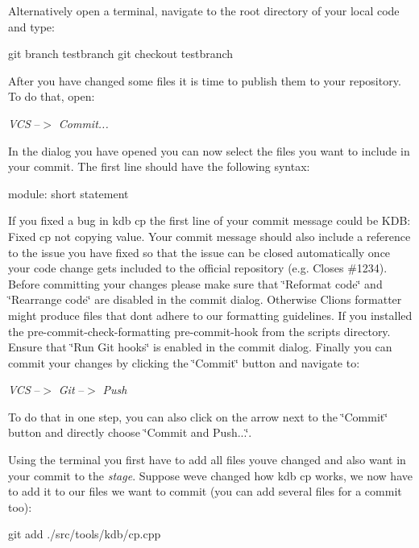 Alternatively open a terminal, navigate to the root directory of your local code and type\+:


\begin{DoxyCode}
git branch testbranch
git checkout testbranch
\end{DoxyCode}


After you have changed some files it is time to publish them to your repository. To do that, open\+:

{\itshape V\+CS} --$>$ {\itshape Commit...}

In the dialog you have opened you can now select the files you want to include in your commit. The first line should have the following syntax\+:


\begin{DoxyCode}
module: short statement
\end{DoxyCode}


If you fixed a bug in {\ttfamily kdb cp} the first line of your commit message could be {\ttfamily K\+DB\+: Fixed cp not copying value}. Your commit message should also include a reference to the issue you have fixed so that the issue can be closed automatically once your code change gets included to the official repository (e.\+g. {\ttfamily Closes \#1234}). Before committing your changes please make sure that \char`\"{}\+Reformat code\char`\"{} and \char`\"{}\+Rearrange code\char`\"{} are disabled in the commit dialog. Otherwise Clions formatter might produce files that don\textquotesingle{}t adhere to our formatting guidelines. If you installed the {\ttfamily pre-\/commit-\/check-\/formatting} pre-\/commit-\/hook from the {\ttfamily scripts} directory. Ensure that \char`\"{}\+Run Git hooks\char`\"{} is enabled in the commit dialog. Finally you can commit your changes by clicking the \char`\"{}\+Commit\char`\"{} button and navigate to\+:

{\itshape V\+CS} --$>$ {\itshape Git} --$>$ {\itshape Push}

To do that in one step, you can also click on the arrow next to the \char`\"{}\+Commit\char`\"{} button and directly choose \char`\"{}\+Commit and Push...\char`\"{}.

Using the terminal you first have to add all files you\textquotesingle{}ve changed and also want in your commit to the {\itshape stage}. Suppose we\textquotesingle{}ve changed how {\ttfamily kdb cp} works, we now have to add it to our files we want to commit (you can add several files for a commit too)\+:


\begin{DoxyCode}
git add ./src/tools/kdb/cp.cpp
\end{DoxyCode}


